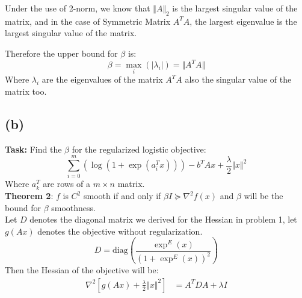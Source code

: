 \documentclass[]{article}
\begin{document}
    Under the use of 2-norm, we know that $\Vert A\Vert_2$ is the largest singular value of the matrix, and in the case of Symmetric Matrix $A^TA$, the largest eigenvalue is the largest singular value of the matrix.

    Therefore the upper bound for $\beta$ is: 
        \begin{equation*}\tag{5.a.3}\label{eqn:5.a.3}
            \beta = \max_{i}(|\lambda_i|) = \Vert A^TA\Vert
        \end{equation*}
    Where $\lambda_i$ are the eigenvalues of the matrix $A^TA$ also the singular value of the matrix too. 

\subsection*{(b)}
    \textbf{Task: } Find the $\beta$ for the regularized logistic objective: 
        $$
            \sum_{i = 0}^{m} \left(
                \log (1 + \exp(a_i^T x))
            \right) - b^TAx+ \frac{\lambda}{2}\Vert x\Vert^2
        $$
    Where $a_k^T$ are rows of a $m\times n$ matrix. 
    \\
    \textbf{Theorem 2}: $f$ is $C^2$ smooth if and only if $\beta I \succeq \nabla^2 f(x)$ and $\beta$ will be the bound for $\beta$ smoothness.
    \\
    Let $D$ denotes the diagonal matrix we derived for the Hessian in problem 1, let $g(Ax)$ denotes the objective without regularization. 
        $$
            D = \text{diag}\left(
                \frac{\exp^E(x)}{(1 + \exp^E(x))^2}
            \right)
        $$
    Then the Hessian of the objective will be: 
        \begin{align*}\tag{5.b.1}\label{eqn:5.b.1}
            \nabla^2[g(Ax) + \frac{\lambda}{2}\Vert x\Vert^2]
            &= A^TDA + \lambda I
        \end{align*}
\end{document}
